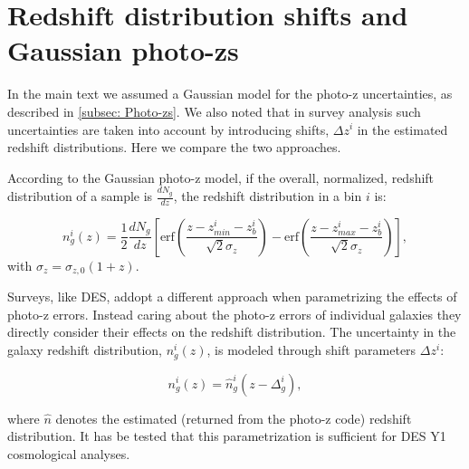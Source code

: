 \documentclass[a4paper,fleqn,usenatbib]{mnras}
\begin{document}
\begin{thebibliography}{99}


\end{thebibliography}


\appendix




\section{Redshift distribution shifts and Gaussian photo-zs}
\label{sec: shift_and_Gaussian}

In the main text we assumed a Gaussian model for the photo-z uncertainties, as described in \ref{subsec: Photo-zs}. We also noted that in survey analysis such uncertainties are taken into account by introducing shifts, $\Delta z^i$ in the estimated redshift distributions. Here we compare the two approaches.

According to the Gaussian photo-z model, if the overall, normalized, redshift distribution of a sample is $\frac{dN_g}{dz}$, the redshift distribution in a bin $i$ is:

\begin{equation}
n_g^{i}(z) = \frac{1}{2}\frac{dN_g}{dz}\left[\mbox{erf}\left(\frac{z - z_{min}^i - z_b^i}{\sqrt{2}\sigma_z}\right) - \mbox{erf}\left(\frac{z - z_{max}^i - z_b^i}{\sqrt{2}\sigma_z}\right) \right],
\end{equation}
with $\sigma_z = \sigma_{z,0}(1 + z)$. 


Surveys, like DES, addopt a different approach when parametrizing the effects of photo-z errors. Instead caring about the photo-z errors of individual galaxies they directly consider their effects on the redshift distribution. The uncertainty in the galaxy redshift distribution, $n_g^i(z)$, is modeled through shift parameters $\Delta z^i$:

\begin{equation}
n_g^i(z) = \hat{n}^i_g(z - \Delta_g^i), 
\end{equation}

where $\hat{n}$ denotes the estimated (returned from the photo-z code) redshift distribution. It has be tested that this parametrization is sufficient for DES Y1 cosmological analyses.
\end{document}
